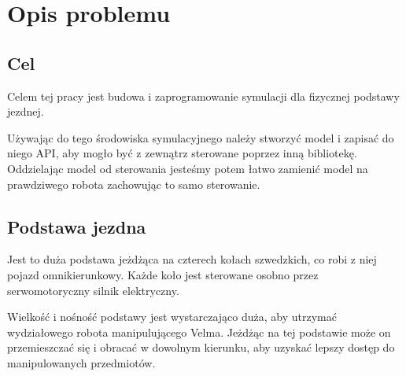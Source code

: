 \chapter{Opis problemu}
\section{Cel}
Celem tej pracy jest budowa i zaprogramowanie symulacji dla fizycznej podstawy jezdnej.

Używając do tego środowiska symulacyjnego należy stworzyć model i zapisać do niego API, aby mogło być z zewnątrz sterowane poprzez inną bibliotekę.
Oddzielając model od sterowania jesteśmy potem łatwo zamienić model na prawdziwego robota zachowując to samo sterowanie.

\section{Podstawa jezdna}
Jest to duża podstawa jeżdżąca na czterech kołach szwedzkich, co robi z niej pojazd omnikierunkowy.
Każde koło jest sterowane osobno przez serwomotoryczny silnik elektryczny.

Wielkość i nośność podstawy jest wystarczająco duża, aby utrzymać wydziałowego robota manipulującego Velma.
Jeżdżąc na tej podstawie może on przemieszczać się i obracać w dowolnym kierunku, aby uzyskać lepszy dostęp do manipulowanych przedmiotów.









